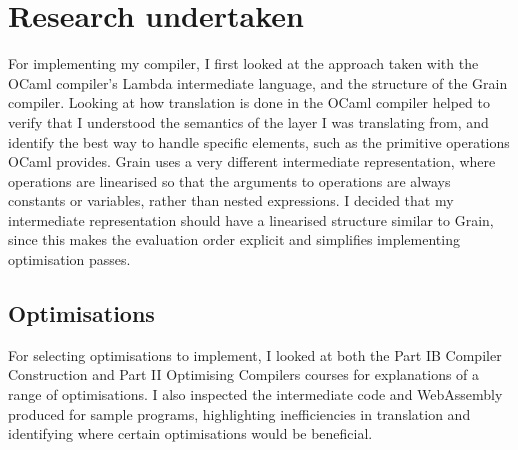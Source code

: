 

\section{Research undertaken}
For implementing my compiler, I first looked at the approach taken with the OCaml compiler's Lambda intermediate language, and the structure of the Grain compiler. Looking at how translation is done in the OCaml compiler helped to verify that I understood the semantics of the layer I was translating from, and identify the best way to handle specific elements, such as the primitive operations OCaml provides. Grain uses a very different intermediate representation, where operations are linearised so that the arguments to operations are always constants or variables, rather than nested expressions. 
I decided that my intermediate representation should have a linearised structure similar to Grain, since this makes the evaluation order explicit and simplifies implementing optimisation passes. %



\subsection{Optimisations}
For selecting optimisations to implement, I looked at both the Part IB Compiler Construction \cite{IB-compilers} and Part II Optimising Compilers \cite{optimising-compilers} courses for explanations of a range of optimisations. %
I also inspected the intermediate code and WebAssembly produced for sample programs, highlighting inefficiencies in translation and identifying where certain optimisations would be beneficial.

